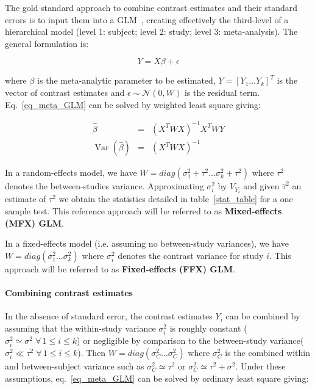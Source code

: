 \documentclass{llncs}
\DeclareMathOperator{\Var}{Var}
\newcommand{\effectvector}{Y}
\newcommand{\effect}[1][i]{\effectvector_{#1}}
\newcommand{\vareffect}[1][i]{V_{\effect[#1]}}
\newcommand{\nStudies}{k}
\newcommand{\varCombined}{\sigma^2_{C}}
\newcommand{\varBetween}{\tau^2}
\newcommand{\varWithinCommon}{\sigma^2}
\newcommand{\varWithin}[1][i]{\sigma^2_{#1}}
\newcommand{\transpose}{^T}
\begin{document}
The gold standard approach to combine contrast estimates and their standard errors is to input them into a GLM~\cite{Cummings2004}, creating effectively the third-level of a hierarchical model (level 1: subject; level 2: study; level 3: meta-analysis). The general formulation is:

\begin{equation}
	\effectvector = X \beta + \epsilon
	\label{eq_meta_GLM}
\end{equation}

where $\beta$ is the meta-analytic parameter to be estimated, $Y = [\effect[1] \ldots \effect[\nStudies] ]\transpose$ is the vector of contrast estimates and $\epsilon \sim \mathcal{N}(0,W)$ is the residual term. Eq.~\eqref{eq_meta_GLM} can be solved by weighted least square giving:


\begin{eqnarray}
	\hat \beta  &=& (X\transpose W X)^{-1} X\transpose W \effectvector \\
	\Var(\hat \beta)  &=& (X\transpose W X)^{-1}
	\label{eq_WLS}
\end{eqnarray}

In a random-effects model, we have $W = diag( \varWithin[1] + \varBetween \ldots \varWithin[\nStudies] + \varBetween )$ where $\varBetween$ denotes the between-studies variance. Approximating $\varWithin$ by $\vareffect[i]$ and given $\hat\varBetween$ an estimate of $\varBetween$ we obtain the statistics detailed in table~\ref{stat_table} for a one sample test. This reference approach will be referred to as \textbf{Mixed-effects (MFX) GLM}.

In a fixed-effects model (i.e. assuming no between-study variances), we have $W = diag( \varWithin[1] \ldots \varWithin[\nStudies] )$ where $\varWithin$ denotes the contrast variance for study $i$. This approach will be referred to as \textbf{Fixed-effects (FFX) GLM}.


\paragraph{Combining contrast estimates}
In the absence of standard error, the contrast estimates $\effect$ can be combined by assuming that the within-study variance $\varWithin$ is roughly constant ($\varWithin \simeq \sigma^2 \; \forall \, 1 \le i \le \nStudies $) or negligible by comparison to the between-study variance($\varWithin \ll \varBetween \; \forall \, 1 \le i \le \nStudies $). Then $W = diag( \varCombined \ldots \varCombined )$ where $\varCombined$ is the combined within and between-subject variance such as $\varCombined \simeq \varBetween$ or $\varCombined \simeq \varBetween + \varWithinCommon$. Under these assumptions, eq.~\eqref{eq_meta_GLM} can be solved by ordinary least square giving:
\end{document}
